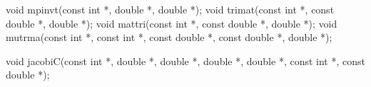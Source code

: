 \documentclass[12pt,]{article}
\newenvironment{Shaded}{\begin{snugshade}}{\end{snugshade}}
\newcommand{\DataTypeTok}[1]{\textcolor[rgb]{0.13,0.29,0.53}{#1}}
\newcommand{\NormalTok}[1]{#1}
\begin{document}
\begin{Shaded}
\begin{Highlighting}[]
\DataTypeTok{void}\NormalTok{ mpinvt(}\DataTypeTok{const} \DataTypeTok{int}\NormalTok{ *, }\DataTypeTok{double}\NormalTok{ *, }\DataTypeTok{double}\NormalTok{ *);}
\DataTypeTok{void}\NormalTok{ trimat(}\DataTypeTok{const} \DataTypeTok{int}\NormalTok{ *, }\DataTypeTok{const} \DataTypeTok{double}\NormalTok{ *, }\DataTypeTok{double}\NormalTok{ *);}
\DataTypeTok{void}\NormalTok{ mattri(}\DataTypeTok{const} \DataTypeTok{int}\NormalTok{ *, }\DataTypeTok{const} \DataTypeTok{double}\NormalTok{ *, }\DataTypeTok{double}\NormalTok{ *);}
\DataTypeTok{void}\NormalTok{ mutrma(}\DataTypeTok{const} \DataTypeTok{int}\NormalTok{ *, }\DataTypeTok{const} \DataTypeTok{int}\NormalTok{ *, }\DataTypeTok{const} \DataTypeTok{double}\NormalTok{ *, }\DataTypeTok{const} \DataTypeTok{double}\NormalTok{ *, }\DataTypeTok{double}\NormalTok{ *);}

\DataTypeTok{void}\NormalTok{ jacobiC(}\DataTypeTok{const} \DataTypeTok{int}\NormalTok{ *, }\DataTypeTok{double}\NormalTok{ *, }\DataTypeTok{double}\NormalTok{ *, }\DataTypeTok{double}\NormalTok{ *, }\DataTypeTok{double}\NormalTok{ *, }\DataTypeTok{const} \DataTypeTok{int}\NormalTok{ *,}
             \DataTypeTok{const} \DataTypeTok{double}\NormalTok{ *);}


\end{Highlighting}
\end{Shaded}
\end{document}

